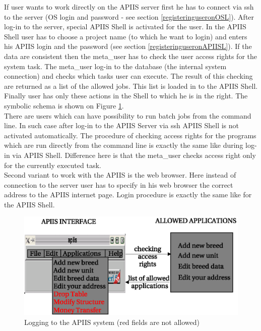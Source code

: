 If user wants to work directly on the APIIS server first he has to connect via ssh to the server (OS login and password - see section \ref{registeringuseronOSL}). After log-in to the server, special APIIS Shell is activated for the user. In the APIIS Shell user has to choose a project name (to which he want to login) and enters his APIIS login and the password (see section \ref{registeringuseronAPIISL}). If the data are consistent then the meta\_user has to check the user access rights for the system task. The meta\_user log-in to the database (the internal system connection) and checks which tasks user can execute. The result of this checking are returned as a list of the allowed jobs. This list is loaded in to the APIIS Shell. Finally user has only these actions in the Shell to which he is in the right. 
The symbolic schema is shown on Figure \ref{fig:serverloging}.\\
There are users which can have possibility to run batch jobs from the command line. In such case after log-in to the APIIS Server via ssh APIIS Shell is not activated automatically. The procedure of checking access rights for the programs which are run directly from the command line is exactly the same like during log-in via APIIS Shell. Difference here is that the meta\_user checks access right only for the currently executed task.\\
Second variant to work with the APIIS is the web browser. Here instead of connection to the server user has to specify in his web browser the correct address to the APIIS internet page. Login procedure is exactly the same like for the APIIS Shell.\\

\begin{figure}[h]
\begin{center}
   \includegraphics[scale=1]{./access-control/serverloging.eps}
   \caption{Logging to the APIIS system (red fields are not allowed)}
   \label{fig:serverloging}
\end{center}
\end{figure}
\newpage


